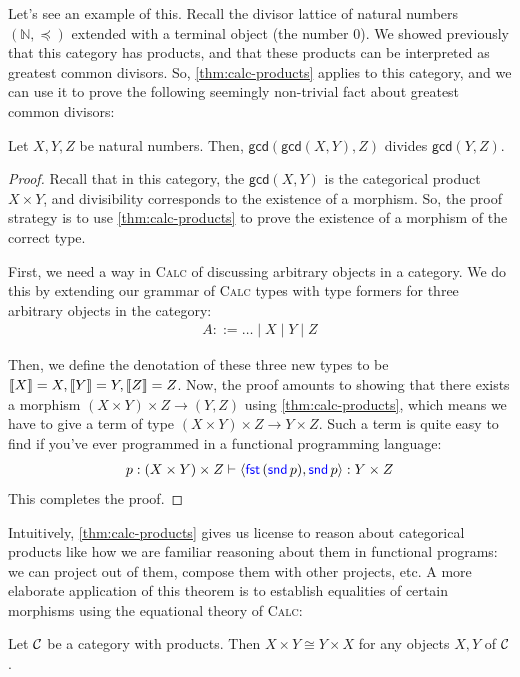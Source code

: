 Let's see an example of this. Recall the divisor lattice of natural numbers
$(\mathbb{N}, \preceq)$ extended with a terminal object (the number $0$). We
showed previously that this category has products, and that these products 
can be interpreted as greatest common divisors. So, \cref{thm:calc-products} applies 
to this category, 
and we can use it to prove the following seemingly non-trivial fact about greatest common divisors:
\begin{proposition}
  Let $X, Y, Z$ be natural numbers. Then, $\mathsf{gcd}(\mathsf{gcd}(X, Y), Z)$
  divides $\mathsf{gcd}(Y, Z)$.
\end{proposition}
\begin{proof}
  Recall that in this category, the $\mathsf{gcd}(X, Y)$ is the categorical product $X \times Y$,
  and divisibility corresponds to the existence of a morphism.
  So, the proof strategy is to use \cref{thm:calc-products} to prove the existence of a morphism 
  of the correct type.

  First, we need a way in \textsc{Calc} of discussing arbitrary objects in a category. 
  We do this by extending our grammar of \textsc{Calc} types with type formers for three 
  arbitrary objects in the category:
  \begin{align*}
    A ::= \dots \mid X \mid Y \mid Z
  \end{align*}

  Then, we define the denotation of these three new types to be $\left\llbracket X \right\rrbracket = X, \left\llbracket Y \right\rrbracket = Y, 
  \left\llbracket Z \right\rrbracket = Z$.
  Now, the proof amounts to showing that there 
  exists a morphism $(X \times Y) \times Z \to (Y, Z)$ using \cref{thm:calc-products}, 
  which means we have to give a term of type $(X \times Y) \times Z \to Y \times Z$.
  Such a term is quite easy to find if you've ever programmed in a functional 
  programming language:
  \begin{align*}
    p : (X \times Y) \times Z \vdash \langle \mathsf{{\color{blue}fst}}\,(\mathsf{{\color{blue}snd}}\,p), \mathsf{{\color{blue}snd}}\,p \rangle : Y \times Z
  \end{align*}
  This completes the proof.
\end{proof}
Intuitively, \cref{thm:calc-products} gives us license to reason about categorical products 
like how we are familiar reasoning about them in functional programs: we can 
project out of them, compose them with other projects, etc.
A more elaborate application of this theorem is to establish equalities of 
certain morphisms using the equational theory of \textsc{Calc}:
\begin{proposition} \label{prop:product-comm-using-calc}
  Let \(\mathcal C\) be a category with products.
  Then \(X\times Y \cong Y \times X\)
  for any objects \(X,Y\) of \(\mathcal C\).
\end{proposition}
